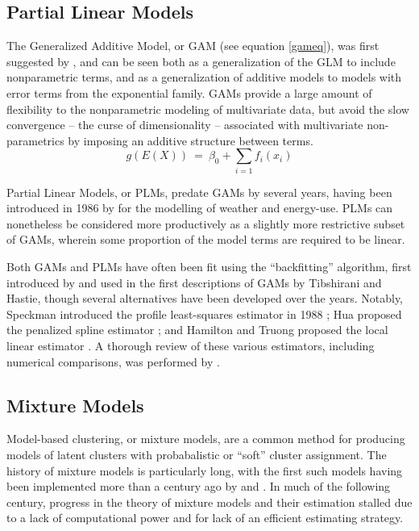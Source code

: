 \documentclass[10pt]{olplainarticle}\usepackage[]{graphicx}\usepackage[]{color}
\begin{document}





\subsection{Partial Linear Models}

The Generalized Additive Model, or GAM (see equation \ref{gameq}), was first suggested by \cite{hastiegam}, and can be seen both as a generalization of the GLM to include nonparametric terms, and as a generalization of additive models to models with error terms from the exponential family. GAMs provide a large amount of flexibility to the nonparametric modeling of multivariate data, but avoid the slow convergence -- the curse of dimensionality -- associated with multivariate non-parametrics by imposing an additive structure between terms. 
\begin{equation} \label{gameq}
  g(E(X)) \ =\ \beta_0 + \sum_{i=1} f_i(x_i)
\end{equation}

Partial Linear Models, or PLMs, predate GAMs by several years, having been introduced in 1986 by \cite{engle} for the modelling of weather and energy-use. PLMs can nonetheless be considered more productively as a slightly more restrictive subset of GAMs, wherein some proportion of the model terms are required to be linear.

Both GAMs and PLMs have often been fit using the ``backfitting'' algorithm, first introduced by \cite{backfit} and used in the first descriptions of GAMs by Tibshirani and Hastie, though several alternatives have been developed over the years. Notably, Speckman introduced the profile least-squares estimator in 1988 \cite{speckman}; Hua proposed the penalized spline estimator \cite{hua}; and Hamilton and Truong proposed the local linear estimator \cite{truong}. A thorough review of these various estimators, including numerical comparisons, was performed by \cite{hua}.

\subsection{Mixture Models} \label{mmhistory}

Model-based clustering, or mixture models, are a common method for producing models of latent clusters with probabalistic or ``soft'' cluster assignment. The history of mixture models is particularly long, with the first such models having been implemented more than a century ago by \cite{newcomb} and \cite{pearson}. In much of the following century, progress in the theory of mixture models and their estimation stalled due to a lack of computational power and for lack of an efficient estimating strategy.
\end{document}
